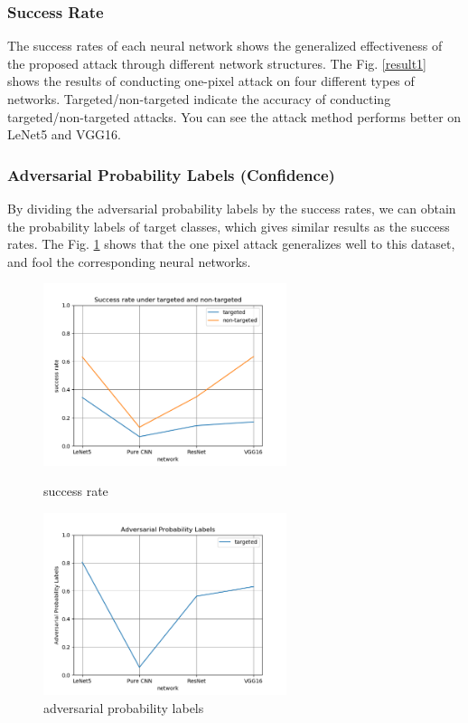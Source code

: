 \documentclass[runningheads]{llncs}
\begin{document}
\subsubsection{Success Rate} 
The success rates of each neural network shows the generalized effectiveness of the proposed attack through different network structures. The Fig. \ref{result1} shows the results of conducting one-pixel attack on four different types of networks. Targeted/non-targeted indicate the accuracy of conducting targeted/non-targeted attacks. You can see the attack method performs better on LeNet5 and VGG16.

\subsubsection{Adversarial Probability Labels (Confidence)} 
By dividing the adversarial probability labels by the success rates, we can obtain the probability labels of target classes, which gives similar results as the success rates. The Fig. \ref{result2} shows that the one pixel attack generalizes well to this dataset, and fool the corresponding neural networks.

\begin{figure}[h]
	\begin{minipage}[t]{0.5\textwidth}
		\centering
		\includegraphics[width=2.8in]{figures/result1.png}
		\caption{success rate} \label{result1}
	\end{minipage}
	\qquad
	\begin{minipage}[t]{0.5\textwidth}
		\centering
		\includegraphics[width=2.8in]{figures/result2.png}
		\caption{adversarial probability labels} \label{result2}
	\end{minipage}
\end{figure}
\end{document}
